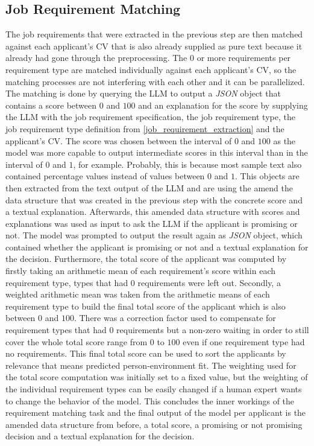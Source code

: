 \documentclass[draft,final]{thesisclass} %
\begin{document}
\subsection{Job Requirement Matching} \label{job_requirement_matching}
The job requirements that were extracted in the previous step are then matched against each applicant's \acs{CV} that is also already supplied as pure text because it already had gone through the preprocessing.
The $0$ or more requirements per requirement type are matched individually against each applicant's \acs{CV}, so the matching processes are not interfering with each other and it can be parallelized.
The matching is done by querying the \acs{LLM} to output a \textit{JSON} object that contains a score between $0$ and $100$ and an explanation for the score by supplying the \acs{LLM} with the job requirement specification, the job requirement type, the job requirement type definition from \ref{job_requirement_extraction} and the applicant's \acs{CV}.
The score was chosen between the interval of $0$ and $100$ as the model was more capable to output intermediate scores in this interval than in the interval of $0$ and $1$, for example.
Probably, this is because most sample text also contained percentage values instead of values between $0$ and $1$.
This objects are then extracted from the text output of the \acs{LLM} and are using the amend the data structure that was created in the previous step with the concrete score and a textual explanation.
Afterwards, this amended data structure with scores and explanations was used as input to ask the \acs{LLM} if the applicant is promising or not.
The model was prompted to output the result again as \textit{JSON} object, which contained whether the applicant is promising or not and a textual explanation for the decision.
Furthermore, the total score of the applicant was computed by firstly taking an arithmetic mean of each requirement's score within each requirement type, types that had $0$ requirements were left out.
Secondly, a weighted arithmetic mean was taken from the arithmetic means of each requirement type to build the final total score of the applicant which is also between $0$ and $100$.
There was a correction factor used to compensate for requirement types that had $0$ requirements but a non-zero waiting in order to still cover the whole total score range from $0$ to $100$ even if one requirement type had no requirements.
This final total score can be used to sort the applicants by relevance that means predicted person-environment fit.
The weighting used for the total score computation was initially set to a fixed value, but the weighting of the individual requirement types can be easily changed if a human expert wants to change the behavior of the model.
This concludes the inner workings of the requirement matching task and the final output of the model per applicant is the amended data structure from before, a total score, a promising or not promising decision and a textual explanation for the decision.
\end{document}

